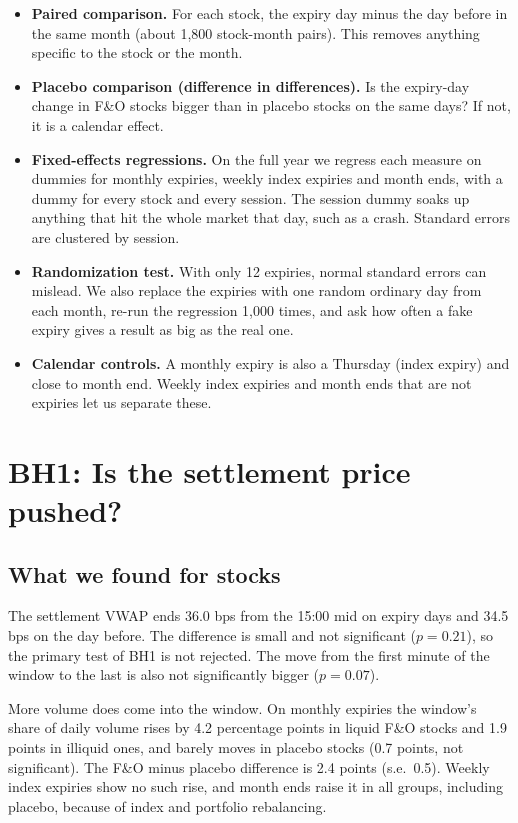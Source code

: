 \documentclass[11pt,a4paper]{article}
\begin{document}
\begin{itemize}
  \item \textbf{Paired comparison.} For each stock, the expiry day minus the day before in the same
  month (about 1,800 stock-month pairs). This removes anything specific to the stock or the month.
  \item \textbf{Placebo comparison (difference in differences).} Is the expiry-day change in F\&O
  stocks bigger than in placebo stocks on the same days? If not, it is a calendar effect.
  \item \textbf{Fixed-effects regressions.} On the full year we regress each measure on dummies
  for monthly expiries, weekly index expiries and month ends, with a dummy for every stock and
  every session. The session dummy soaks up anything that hit the whole market that day, such as a
  crash. Standard errors are clustered by session.
  \item \textbf{Randomization test.} With only 12 expiries, normal standard errors can mislead. We
  also replace the expiries with one random ordinary day from each month, re-run the regression
  1,000 times, and ask how often a fake expiry gives a result as big as the real one.
  \item \textbf{Calendar controls.} A monthly expiry is also a Thursday (index expiry) and close to
  month end. Weekly index expiries and month ends that are not expiries let us separate these.
\end{itemize}

\section{BH1: Is the settlement price pushed?}\label{sec:bh1}

\subsection{What we found for stocks}

The settlement VWAP ends 36.0 bps from the 15:00 mid on expiry days and 34.5 bps on the day
before. The difference is small and not significant ($p = 0.21$), so the primary test of BH1 is
not rejected. The move from the first minute of the window to the last is also not significantly
bigger ($p = 0.07$).

More volume does come into the window. On monthly expiries the window's share of daily volume
rises by 4.2 percentage points in liquid F\&O stocks and 1.9 points in illiquid ones, and barely
moves in placebo stocks (0.7 points, not significant). The F\&O minus placebo difference is
2.4 points (s.e.\ 0.5). Weekly index expiries show no such rise, and month ends raise it in all
groups, including placebo, because of index and portfolio rebalancing.
\end{document}
